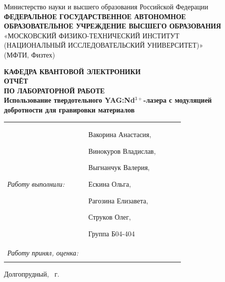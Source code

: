 \documentclass[12pt, a4paper]{article}
\begin{document}

\begin{titlepage}
\thispagestyle{empty}

\begin{center}
\small
Министерство науки и высшего образования Российской Федерации\\[2mm]
\textbf{ФЕДЕРАЛЬНОЕ ГОСУДАРСТВЕННОЕ АВТОНОМНОЕ
ОБРАЗОВАТЕЛЬНОЕ УЧРЕЖДЕНИЕ ВЫСШЕГО ОБРАЗОВАНИЯ}\\[1mm]
«МОСКОВСКИЙ ФИЗИКО-ТЕХНИЧЕСКИЙ ИНСТИТУТ\\
(НАЦИОНАЛЬНЫЙ ИССЛЕДОВАТЕЛЬСКИЙ УНИВЕРСИТЕТ)»\\
(МФТИ, Физтех)
\end{center}

\vspace{18mm}

\begin{center}
\large \textbf{КАФЕДРА КВАНТОВОЙ ЭЛЕКТРОНИКИ}\\[10mm]
\Large \textbf{ОТЧЁТ}\\[2mm]
\large \textbf{ПО ЛАБОРАТОРНОЙ РАБОТЕ}\\[14mm]
\Large \textbf{Использование твердотельного YAG:Nd$^{3+}$-лазера с модуляцией добротности для гравировки материалов}
\end{center}

\vfill

\noindent
\begin{tabular}{@{}p{0.44\linewidth}p{0.52\linewidth}@{}}
\textit{Работу выполнили:} & Вакорина Анастасия,

Винокуров Владислав,

Выгнанчук Валерия,

Ескина Ольга,

Рагозина Елизавета,

Струков Олег,

Группа Б04-404 \\[8mm]

\textit{Работу принял, оценка:} & \\[3mm]
 \\
\end{tabular}


\vspace{12mm}

\begin{center}
\small Долгопрудный, \the\year{}~г.
\end{center}

\end{titlepage}
\end{document}
